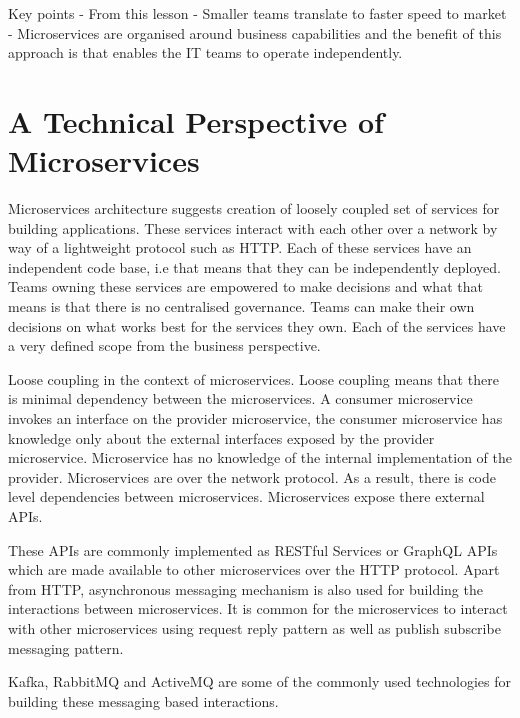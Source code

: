 Key points
- From this lesson
- Smaller teams translate to faster speed to market
- Microservices are organised around business capabilities and the benefit of this approach is that enables the IT teams to operate independently.

\section{A Technical Perspective of Microservices}

Microservices architecture suggests creation of loosely coupled set of services for building applications.
These services interact with each other over a network by way of a lightweight protocol such as HTTP.
Each of these services have an independent code base, i.e that means that they can be independently deployed.
Teams owning these services are empowered to make decisions and what that means is that there is no centralised governance.
Teams can make their own decisions on what works best for the services they own.
Each of the services have a very defined scope from the business perspective.

Loose coupling in the context of microservices.
Loose coupling means that there is minimal dependency between the microservices.
A consumer microservice invokes an interface on the provider microservice, the consumer microservice has knowledge only about the external interfaces exposed by the provider microservice.
Microservice has no knowledge of the internal implementation of the provider.
Microservices are over the network protocol.
As a result, there is code level dependencies between microservices.
Microservices expose there external APIs.

These APIs are commonly implemented as RESTful Services or GraphQL APIs which are made available to other microservices over the HTTP protocol.
Apart from HTTP, asynchronous messaging mechanism is also used for building the interactions between microservices.
It is common for the microservices to interact with other microservices using request reply pattern as well as publish subscribe messaging pattern.

Kafka, RabbitMQ and ActiveMQ are some of the commonly used technologies for building these messaging based interactions.

